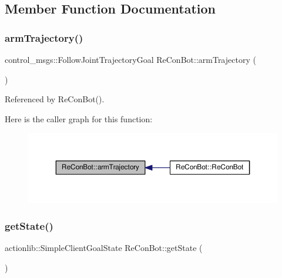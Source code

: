 \subsection{Member Function Documentation}
\mbox{\label{class_re_con_bot_a950f2769ca61ff7b663d86ed2cf19c14}} 
\subsubsection{\texorpdfstring{arm\+Trajectory()}{armTrajectory()}}
{\footnotesize\ttfamily control\+\_\+msgs\+::\+Follow\+Joint\+Trajectory\+Goal Re\+Con\+Bot\+::arm\+Trajectory (\begin{DoxyParamCaption}{ }\end{DoxyParamCaption})}



Referenced by Re\+Con\+Bot().

Here is the caller graph for this function\+:
\nopagebreak
\begin{figure}[H]
\begin{center}
\leavevmode
\includegraphics[width=350pt]{d9/d0b/class_re_con_bot_a950f2769ca61ff7b663d86ed2cf19c14_icgraph}
\end{center}
\end{figure}
\mbox{\label{class_re_con_bot_a3d9656755c06ded1f3b88ce05565f758}} 
\subsubsection{\texorpdfstring{get\+State()}{getState()}}
{\footnotesize\ttfamily actionlib\+::\+Simple\+Client\+Goal\+State Re\+Con\+Bot\+::get\+State (\begin{DoxyParamCaption}{ }\end{DoxyParamCaption})}



